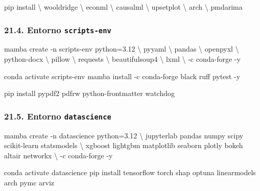 \documentclass[
  doc,
  floatsintext,
  longtable,
  a4paper,
  nolmodern,
  notxfonts,
  notimes,
  12pt,
  colorlinks=true,linkcolor=blue,citecolor=blue,urlcolor=blue]{apa7}
\newenvironment{Shaded}{\begin{snugshade}}{\end{snugshade}}
\newcommand{\AttributeTok}[1]{\textcolor[rgb]{0.40,0.45,0.13}{#1}}
\newcommand{\DataTypeTok}[1]{\textcolor[rgb]{0.68,0.00,0.00}{#1}}
\newcommand{\ExtensionTok}[1]{\textcolor[rgb]{0.00,0.23,0.31}{#1}}
\newcommand{\NormalTok}[1]{\textcolor[rgb]{0.00,0.23,0.31}{#1}}
\begin{document}
\begin{Shaded}
\begin{Highlighting}[]
\ExtensionTok{pip}\NormalTok{ install }\DataTypeTok{\textbackslash{}}
\NormalTok{  wooldridge }\DataTypeTok{\textbackslash{}}
\NormalTok{  econml }\DataTypeTok{\textbackslash{}}
\NormalTok{  causalml }\DataTypeTok{\textbackslash{}}
\NormalTok{  upsetplot }\DataTypeTok{\textbackslash{}}
\NormalTok{  arch }\DataTypeTok{\textbackslash{}}
\NormalTok{  pmdarima}
\end{Highlighting}
\end{Shaded}

\subsubsection{\texorpdfstring{21.4. Entorno
\texttt{scripts-env}}{21.4. Entorno scripts-env}}\label{entorno-scripts-env}

\begin{Shaded}
\begin{Highlighting}[]
\ExtensionTok{mamba}\NormalTok{ create }\AttributeTok{{-}n}\NormalTok{ scripts{-}env python=3.12 }\DataTypeTok{\textbackslash{}}
\NormalTok{  pyyaml }\DataTypeTok{\textbackslash{}}
\NormalTok{  pandas }\DataTypeTok{\textbackslash{}}
\NormalTok{  openpyxl }\DataTypeTok{\textbackslash{}}
\NormalTok{  python{-}docx }\DataTypeTok{\textbackslash{}}
\NormalTok{  pillow }\DataTypeTok{\textbackslash{}}
\NormalTok{  requests }\DataTypeTok{\textbackslash{}}
\NormalTok{  beautifulsoup4 }\DataTypeTok{\textbackslash{}}
\NormalTok{  lxml }\DataTypeTok{\textbackslash{}}
  \AttributeTok{{-}c}\NormalTok{ conda{-}forge }\AttributeTok{{-}y}

\ExtensionTok{conda}\NormalTok{ activate scripts{-}env}
\ExtensionTok{mamba}\NormalTok{ install }\AttributeTok{{-}c}\NormalTok{ conda{-}forge black ruff pytest }\AttributeTok{{-}y}

\ExtensionTok{pip}\NormalTok{ install pypdf2 pdfrw python{-}frontmatter watchdog}
\end{Highlighting}
\end{Shaded}

\subsubsection{\texorpdfstring{21.5. Entorno
\texttt{datascience}}{21.5. Entorno datascience}}\label{entorno-datascience}

\begin{Shaded}
\begin{Highlighting}[]
\ExtensionTok{mamba}\NormalTok{ create }\AttributeTok{{-}n}\NormalTok{ datascience python=3.12 }\DataTypeTok{\textbackslash{}}
\NormalTok{  jupyterlab pandas numpy scipy scikit{-}learn statsmodels }\DataTypeTok{\textbackslash{}}
\NormalTok{  xgboost lightgbm matplotlib seaborn plotly bokeh altair networkx }\DataTypeTok{\textbackslash{}}
  \AttributeTok{{-}c}\NormalTok{ conda{-}forge }\AttributeTok{{-}y}

\ExtensionTok{conda}\NormalTok{ activate datascience}
\ExtensionTok{pip}\NormalTok{ install tensorflow torch shap optuna linearmodels arch pymc arviz}
\end{Highlighting}
\end{Shaded}
\end{document}

